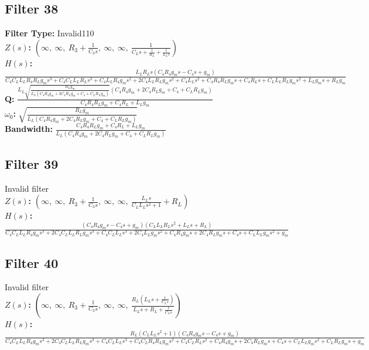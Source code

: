 \documentclass{article}
\begin{document}
\subsection*{Filter 38}
\textbf{Filter Type:} Invalid110 \\ 
\textbf{$Z(s)$:} $\left( \infty, \  \infty, \  R_{3} + \frac{1}{C_{3} s}, \  \infty, \  \infty, \  \frac{1}{C_{L} s + \frac{1}{R_{L}} + \frac{1}{L_{L} s}}\right)$ \\ 
\textbf{$H(s)$:} $\frac{L_{L} R_{L} s \left(C_{4} R_{4} g_{m} s - C_{4} s + g_{m}\right)}{C_{4} C_{L} L_{L} R_{4} R_{L} g_{m} s^{3} + C_{4} C_{L} L_{L} R_{L} s^{3} + C_{4} L_{L} R_{4} g_{m} s^{2} + 2 C_{4} L_{L} R_{L} g_{m} s^{2} + C_{4} L_{L} s^{2} + C_{4} R_{4} R_{L} g_{m} s + C_{4} R_{L} s + C_{L} L_{L} R_{L} g_{m} s^{2} + L_{L} g_{m} s + R_{L} g_{m}}$ \\ 
\textbf{Q:} $\frac{L_{L} \sqrt{\frac{R_{L} g_{m}}{L_{L} \left(C_{4} R_{4} g_{m} + 2 C_{4} R_{L} g_{m} + C_{4} + C_{L} R_{L} g_{m}\right)}} \left(C_{4} R_{4} g_{m} + 2 C_{4} R_{L} g_{m} + C_{4} + C_{L} R_{L} g_{m}\right)}{C_{4} R_{4} R_{L} g_{m} + C_{4} R_{L} + L_{L} g_{m}}$ \\ 
\textbf{$\omega_0$:} $\sqrt{\frac{R_{L} g_{m}}{L_{L} \left(C_{4} R_{4} g_{m} + 2 C_{4} R_{L} g_{m} + C_{4} + C_{L} R_{L} g_{m}\right)}}$ \\ 
\textbf{Bandwidth:} $\frac{C_{4} R_{4} R_{L} g_{m} + C_{4} R_{L} + L_{L} g_{m}}{L_{L} \left(C_{4} R_{4} g_{m} + 2 C_{4} R_{L} g_{m} + C_{4} + C_{L} R_{L} g_{m}\right)}$ \\ 
\subsection*{Filter 39}
Invalid filter \\ 
\textbf{$Z(s)$:} $\left( \infty, \  \infty, \  R_{3} + \frac{1}{C_{3} s}, \  \infty, \  \infty, \  \frac{L_{L} s}{C_{L} L_{L} s^{2} + 1} + R_{L}\right)$ \\ 
\textbf{$H(s)$:} $\frac{\left(C_{4} R_{4} g_{m} s - C_{4} s + g_{m}\right) \left(C_{L} L_{L} R_{L} s^{2} + L_{L} s + R_{L}\right)}{C_{4} C_{L} L_{L} R_{4} g_{m} s^{3} + 2 C_{4} C_{L} L_{L} R_{L} g_{m} s^{3} + C_{4} C_{L} L_{L} s^{3} + 2 C_{4} L_{L} g_{m} s^{2} + C_{4} R_{4} g_{m} s + 2 C_{4} R_{L} g_{m} s + C_{4} s + C_{L} L_{L} g_{m} s^{2} + g_{m}}$ \\ 
\subsection*{Filter 40}
Invalid filter \\ 
\textbf{$Z(s)$:} $\left( \infty, \  \infty, \  R_{3} + \frac{1}{C_{3} s}, \  \infty, \  \infty, \  \frac{R_{L} \left(L_{L} s + \frac{1}{C_{L} s}\right)}{L_{L} s + R_{L} + \frac{1}{C_{L} s}}\right)$ \\ 
\textbf{$H(s)$:} $\frac{R_{L} \left(C_{L} L_{L} s^{2} + 1\right) \left(C_{4} R_{4} g_{m} s - C_{4} s + g_{m}\right)}{C_{4} C_{L} L_{L} R_{4} g_{m} s^{3} + 2 C_{4} C_{L} L_{L} R_{L} g_{m} s^{3} + C_{4} C_{L} L_{L} s^{3} + C_{4} C_{L} R_{4} R_{L} g_{m} s^{2} + C_{4} C_{L} R_{L} s^{2} + C_{4} R_{4} g_{m} s + 2 C_{4} R_{L} g_{m} s + C_{4} s + C_{L} L_{L} g_{m} s^{2} + C_{L} R_{L} g_{m} s + g_{m}}$ \\ 
\end{document}

